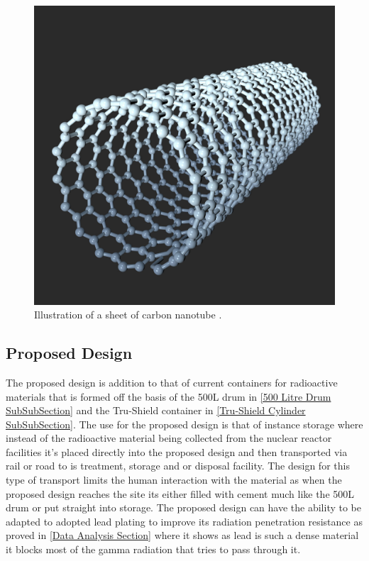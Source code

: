 \begin{figure}[H]
\centering
\includegraphics[scale=0.2]{Media/ProductDesign/Illustration-carbon-nanotube.jpg}
\caption{Illustration of a sheet of carbon nanotube \cite{CarbonNano}.}
\label{Carbon Nanotube image}
\end{figure}

\subsection{Proposed Design}
\label{Proposed Design SubSection}

The proposed design is addition to that of current containers for radioactive materials that is formed off the basis of the 500L drum in \cref{500 Litre Drum SubSubSection} and the Tru-Shield container in \cref{Tru-Shield Cylinder SubSubSection}. The use for the proposed design is that of instance storage where instead of the radioactive material being collected from the nuclear reactor facilities it's placed directly into the proposed design and then transported via rail or road to is treatment, storage and or disposal facility. The design for this type of transport limits the human interaction with the material as when the proposed design reaches the site its either filled with cement much like the 500L drum or put straight into storage. The proposed design can have the ability to be adapted to adopted lead plating to improve its radiation penetration resistance as proved in \cref{Data Analysis Section} where it shows as lead is such a dense material it blocks most of the gamma radiation that tries to pass through it. \\

